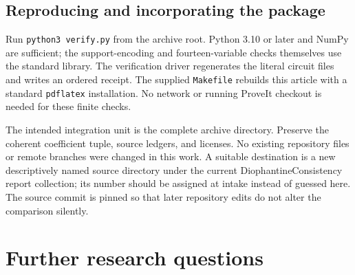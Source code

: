 \documentclass[11pt,a4paper]{article}
\theoremstyle{definition}
\theoremstyle{remark}
\numberwithin{equation}{section}
\begin{document}
\subsection{Reproducing and incorporating the package}

Run \texttt{python3 verify.py} from the archive root. Python 3.10 or
later and NumPy are sufficient; the support-encoding and fourteen-variable
checks themselves use the standard library. The verification driver
regenerates the literal circuit files and writes an ordered receipt.
The supplied \texttt{Makefile} rebuilds this article with a standard
\texttt{pdflatex} installation. No network or running ProveIt checkout
is needed for these finite checks.

The intended integration unit is the complete archive directory.
Preserve the coherent coefficient tuple, source ledgers, and licenses.
No existing repository files or remote branches were changed in this
work. A suitable destination is a new descriptively named source
directory under the current DiophantineConsistency report collection;
its number should be assigned at intake instead of guessed here.
The source commit is pinned so that later repository edits do not alter
the comparison silently.

\section{Further research questions}
\end{document}
